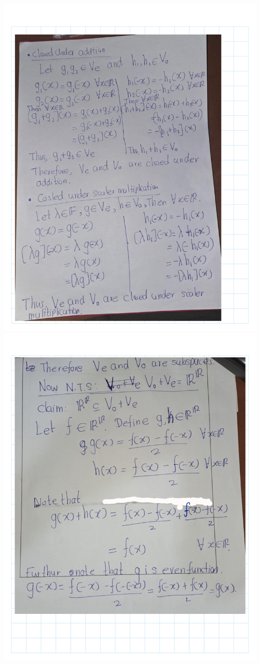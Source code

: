 \documentclass[
]{book}
\theoremstyle{definition}
\theoremstyle{definition}
\theoremstyle{definition}
\theoremstyle{definition}
\theoremstyle{remark}
\begin{document}
\begin{enumerate}
  \includegraphics{fig/Ex1C/Ex/Ex-32.png}
  \includegraphics{fig/Ex1C/Ex/Ex-33.png}

\end{enumerate}
\end{document}
